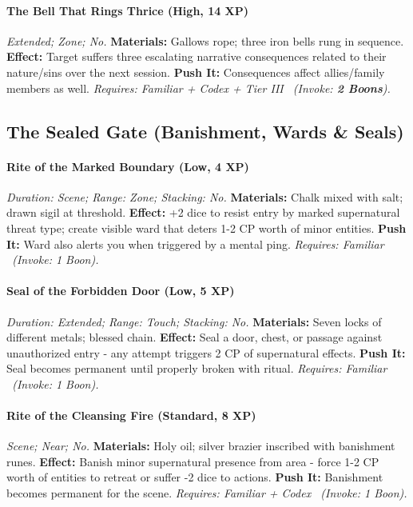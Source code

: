 \documentclass[12pt,twoside]{book}
\begin{document}
\paragraph{The Bell That Rings Thrice (High, 14 XP)} \emph{Extended; Zone; No.}
\textbf{Materials:} Gallows rope; three iron bells rung in sequence.
\textbf{Effect:} Target suffers three escalating narrative consequences related to their nature/sins over the next session.
\textbf{Push It:} Consequences affect allies/family members as well.
\emph{Requires: Familiar + Codex + Tier III \ (\textit{Invoke:} \textbf{2 Boons}).}

\subsection{The Sealed Gate (Banishment, Wards \& Seals)}
\paragraph{Rite of the Marked Boundary (Low, 4 XP)} \emph{Duration: Scene; Range: Zone; Stacking: No.}
\textbf{Materials:} Chalk mixed with salt; drawn sigil at threshold.
\textbf{Effect:} +2 dice to resist entry by marked supernatural threat type; create visible ward that deters 1-2 CP worth of minor entities.
\textbf{Push It:} Ward also alerts you when triggered by a mental ping.
\emph{Requires: Familiar \ (\textit{Invoke:} 1 Boon).}
\paragraph{Seal of the Forbidden Door (Low, 5 XP)} \emph{Duration: Extended; Range: Touch; Stacking: No.}
\textbf{Materials:} Seven locks of different metals; blessed chain.
\textbf{Effect:} Seal a door, chest, or passage against unauthorized entry - any attempt triggers 2 CP of supernatural effects.
\textbf{Push It:} Seal becomes permanent until properly broken with ritual.
\emph{Requires: Familiar \ (\textit{Invoke:} 1 Boon).}
\paragraph{Rite of the Cleansing Fire (Standard, 8 XP)} \emph{Scene; Near; No.}
\textbf{Materials:} Holy oil; silver brazier inscribed with banishment runes.
\textbf{Effect:} Banish minor supernatural presence from area - force 1-2 CP worth of entities to retreat or suffer -2 dice to actions.
\textbf{Push It:} Banishment becomes permanent for the scene.
\emph{Requires: Familiar + Codex \ (\textit{Invoke:} 1 Boon).}
\end{document}
